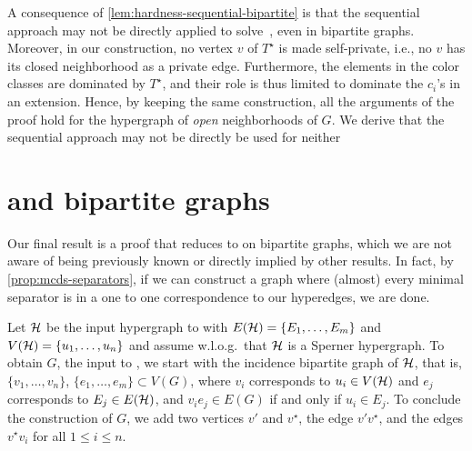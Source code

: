 A consequence of \autoref{lem:hardness-sequential-bipartite} is that the sequential approach may not be directly applied to solve~\domenum{}, even in bipartite graphs.
Moreover, in our construction, no vertex $v$ of $T^\star$ is made self-private, i.e., no $v$ has its closed neighborhood as a private edge.
Furthermore, the elements in the color classes are dominated by $T^\star$, and their role is thus limited to dominate the $c_i$'s in an extension. 
Hence, by keeping the same construction, all the arguments of the  proof hold for the hypergraph of \emph{open} neighborhoods of $G$.
We derive that the sequential approach may not be directly be used for \tdomenum{} neither%

\section{\transenum{} and bipartite graphs}\label{sec:mcds-hardness}

Our final result is a proof that \transenum{} reduces to \cdomenum{} on bipartite graphs, which we are not aware of being previously known or directly implied by other results. In fact, by \autoref{prop:mcds-separators}, if we can construct a graph where (almost) every minimal separator is in a one to one correspondence to our hyperedges, we are done.

Let $\mathcal{H}$ be the input hypergraph to \transenum{} with $E(\mathcal{H}) = \{E_1, \dots, E_m\}$ and $V(\mathcal{H}) = \{u_1, \dots, u_n\}$ and assume w.l.o.g.~that $\mathcal{H}$ is a Sperner hypergraph. To obtain $G$, the input to \cdomenum{}, we start with the incidence bipartite graph of $\mathcal{H}$, that is, $\{v_1, \dots, v_n\}$, $\{e_1, \dots, e_m\} \subset V(G)$, where $v_i$ corresponds to $u_i \in V(\mathcal{H})$ and $e_j$ corresponds to $E_j \in E(\mathcal{H})$, and $v_ie_j \in E(G)$ if and only if $u_i \in E_j$. To conclude the construction of $G$, we add two vertices $v'$ and $v^\star$, the edge $v'v^\star$, and the edges $v^\star v_i$ for all $1\leq i\leq n$.

